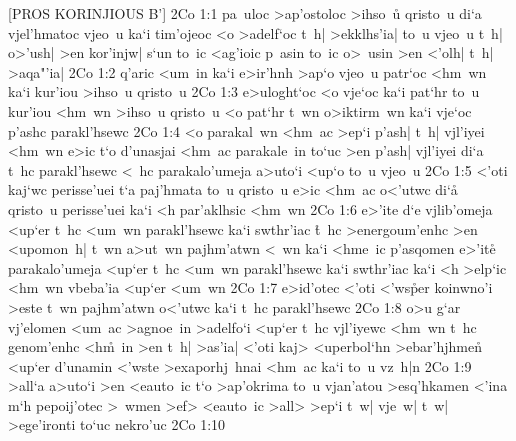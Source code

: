 [PROS KORINJIOUS B']
\vs 2Co 1:1
pa~uloc
>ap'ostoloc
>ihso~u\r{}
qristo~u
di`a
vjel'hmatoc
vjeo~u
ka`i
tim'ojeoc
<o
>adelf`oc
t~h|
>ekklhs'ia|
to~u
vjeo~u
t~h|
o>'ush|
>en
kor'injw|
s`un
to~ic
<ag'ioic
p~asin
to~ic
o>~usin
>en
<'olh|
t~h|
>aqa"'ia|\bibvsend
\vs 2Co 1:2
q'aric
<um~in
ka`i
e>ir'hnh
>ap`o
vjeo~u
patr`oc
<hm~wn
ka`i
kur'iou
>ihso~u
qristo~u\bibvsend
\vs 2Co 1:3
e>uloght`oc
<o
vje`oc
ka`i
pat`hr
to~u
kur'iou
<hm~wn
>ihso~u
qristo~u
<o
pat`hr
t~wn
o>iktirm~wn
ka`i
vje`oc
p'ashc
parakl'hsewc\bibvsend
\vs 2Co 1:4
<o
parakal~wn
<hm~ac
>ep`i
p'ash|
t~h|
vjl'iyei
<hm~wn
e>ic
t`o
d'unasjai
<hm~ac
parakale~in
to`uc
>en
p'ash|
vjl'iyei
di`a
t~hc
parakl'hsewc
<~hc
parakalo'umeja
a>uto`i
<up`o
to~u
vjeo~u\bibvsend
\vs 2Co 1:5
<'oti
kaj`wc
perisse'uei
t`a
paj'hmata
to~u
qristo~u
e>ic
<hm~ac
o<'utwc
di`a\r{}
qristo~u
perisse'uei
ka`i
<h
par'aklhsic
<hm~wn\bibvsend
\vs 2Co 1:6
e>'ite
d`e
vjlib'omeja
<up`er
t~hc
<um~wn
parakl'hsewc
ka`i
swthr'iac
\r{t}~hc
>energoum'enhc
>en
<upomon~h|
t~wn
a>ut~wn
pajhm'atwn
<~wn
ka`i
<hme~ic
p'asqomen
e>'ite\r{}
parakalo'umeja
<up`er
t~hc
<um~wn
parakl'hsewc
ka`i
swthr'iac
ka`i
<h
>elp`ic
<hm~wn
vbeba'ia
<up`er
<um~wn\bibvsend
\vs 2Co 1:7
e>id'otec
<'oti
<'ws\r{p}er
koinwno'i
>este
t~wn
pajhm'atwn
o<'utwc
ka`i
t~hc
parakl'hsewc\bibvsend
\vs 2Co 1:8
o>u
g`ar
vj'elomen
<um~ac
>agnoe~in
>adelfo`i
<up`er
t~hc
vjl'iyewc
<hm~wn
t~hc
genom'enhc
<h\r{m}~in
>en
t~h|
>as'ia|
<'oti
kaj>
<uperbol`hn
>ebar'hjhmen\r{}
<up`er
d'unamin
<'wste
>exaporhj~hnai
<hm~ac
ka`i
to~u
vz~h|n\bibvsend
\vs 2Co 1:9
>all`a
a>uto`i
>en
<eauto~ic
t`o
>ap'okrima
to~u
vjan'atou
>esq'hkamen
<'ina
m`h
pepoij'otec
>~wmen
>ef>
<eauto~ic
>all>
>ep`i
t~w|
vje~w|
t~w|
>ege'ironti
to`uc
nekro'uc\bibvsend
\vs 2Co 1:10
